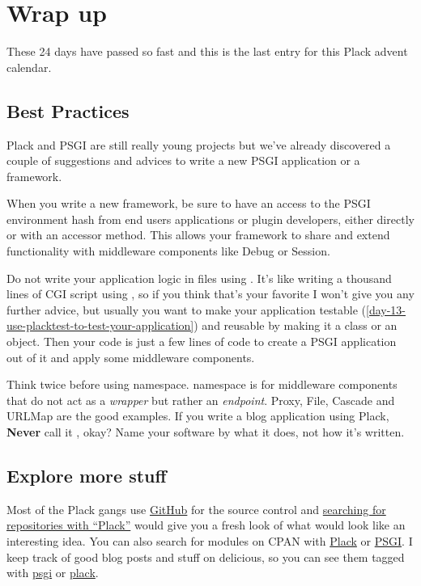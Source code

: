 \chapter{Wrap up}\label{day-24-wrap-up}

These 24 days have passed so fast and this is the last entry for this Plack
advent calendar.

\section{Best Practices}\label{best-practices}

Plack and PSGI are still really young projects but we've already
discovered a couple of suggestions and advices to write a new PSGI
application or a framework.

When you write a new framework, be sure to have an access to the PSGI
environment hash from end users applications or plugin developers,
either directly or with an accessor method. This allows your framework
to share and extend functionality with middleware components like Debug
or Session.

Do not write your application logic in  files using
. It's like writing a thousand lines of CGI script using
, so if you think that's your favorite I won't give you any
further advice, but usually you want to make your application testable
(\autoref{day-13-use-placktest-to-test-your-application})
and reusable by making it a class or an object. Then your
 code is just a few lines of code to create a PSGI
application out of it and apply some middleware components.

Think twice before using  namespace.  namespace
is for middleware components that do not act as a \emph{wrapper} but
rather an \emph{endpoint}. Proxy, File, Cascade and URLMap are the good
examples. If you write a blog application using Plack, \textbf{Never}
call it , okay? Name your software by what it does, not
how it's written.

\section{Explore more stuff}\label{explore-more-stuff}

Most of the Plack gangs use \href{http://github.com/}{GitHub} for the
source control and
\href{http://github.com/search?q=plack\&type=Repositories}{searching
for repositories with ``Plack''} would give you a fresh look of what
would look like an interesting idea. You can also search for modules on
CPAN with
\href{http://search.cpan.org/search?query=plack\&mode=module}{Plack} or
\href{http://search.cpan.org/search?query=psgi\&mode=module}{PSGI}. I
keep track of good blog posts and stuff on delicious, so you can see
them tagged with \href{http://delicious.com/miyagawa/psgi}{psgi} or
\href{http://delicious.com/miyagawa/plack}{plack}.

